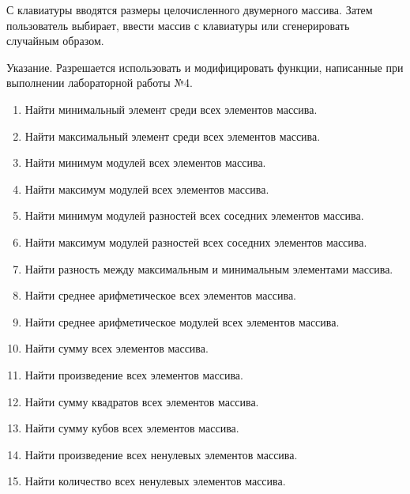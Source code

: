 
\labtask

С клавиатуры вводятся размеры целочисленного двумерного массива.
Затем пользователь выбирает, ввести массив с клавиатуры или сгенерировать случайным образом.

Указание. Разрешается использовать и модифицировать функции, написанные при выполнении лабораторной работы №4.

\begin{enumerate}
	\item Найти минимальный элемент среди всех элементов массива.

	\item Найти максимальный элемент среди всех элементов массива.

	\item Найти минимум модулей всех элементов массива.

	\item Найти максимум модулей всех элементов массива.

	\item Найти минимум модулей разностей всех соседних элементов массива.

	\item  Найти максимум модулей разностей всех соседних элементов массива.

	\item Найти разность между максимальным и минимальным элементами массива.

	\item Найти среднее арифметическое всех элементов массива.

	\item Найти среднее арифметическое модулей всех элементов массива.

	\item Найти сумму всех элементов массива.

	\item Найти произведение всех элементов массива.

	\item Найти сумму квадратов всех элементов массива.

	\item Найти сумму кубов всех элементов массива.

	\item Найти произведение всех ненулевых элементов массива.

	\item Найти количество всех ненулевых элементов массива.

\end{enumerate}


